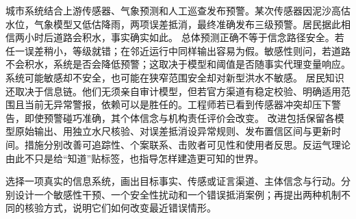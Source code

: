 城市系统结合上游传感器、气象预测和人工巡查发布预警。某次传感器因泥沙高估水位，气象模型又低估降雨，两项误差抵消，最终准确发布三级预警。居民据此相信两小时后道路会积水，事实确实如此。 总体预测正确不等于信念路径安全。若任一误差稍小，等级就错；在邻近运行中同样输出容易为假。敏感性则问，若道路不会积水，系统是否会降低预警；这取决于模型和阈值是否随事实代理变量响应。系统可能敏感却不安全，也可能在狭窄范围安全却对新型洪水不敏感。 居民知识还取决于信息链。他们无须亲自审计模型，但若官方渠道有稳定校验、明确适用范围且当前无异常警报，依赖可以是胜任的。工程师若已看到传感器冲突却压下警告，即使预警碰巧准确，其个体信念与机构责任评价会改变。 改进包括保留各模型原始输出、用独立水尺核验、对误差抵消设异常规则、发布置信区间与更新时间。措施分别改善可追踪性、个案联系、击败者可见性和使用者反思。反运气理论由此不只是给“知道”贴标签，也指导怎样建造更可知的世界。

\begin{tcolorbox}[breakable,colback=white,colframe=blue!30!black,title={本章研读任务},fonttitle=\bfseries]
选择一项真实的信息系统，画出目标事实、传感或证言渠道、主体信念与行动。分别设计一个敏感性干预、一个安全性扰动和一个错误抵消案例；再提出两种机制不同的核验方式，说明它们如何改变最近错误情形。
\end{tcolorbox}
